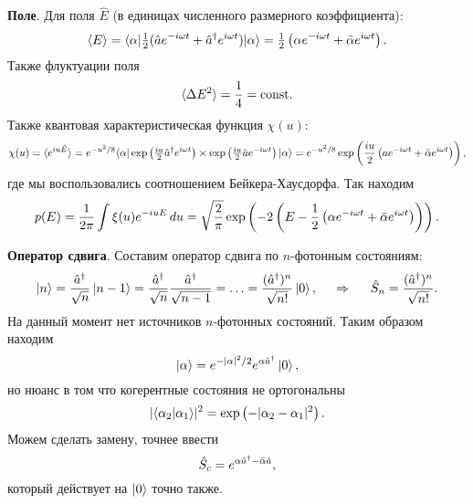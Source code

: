 \textbf{Поле}. Для поля $\hat{E}$ (в единицах численного размерного коэффициента):
\begin{equation*}
    \langle E\rangle  = \bk{\alpha}[ \tfrac{1}{2}(\hat{a} e^{- i \omega t} + \hat{a}\D e^{i \omega t})]{\alpha} = \tfrac{1}{2}\left(\alpha e^{- i \omega t} + \bar{\alpha} e^{i \omega t}\right).
\end{equation*}
Также флуктуации поля
\begin{equation*}
    \langle \Delta E^2\rangle = \frac{1}{4} = \textnormal{const}.
\end{equation*}
Также квантовая характеристическая функция $\chi(u)$:
\begin{equation*}
    \chi(u) = \langle e^{i u \hat{E}}\rangle = e^{- u^2/8} \bk{\alpha}[\exp\left( \tfrac{i u}{2} \hat{a}\D e^{i \omega t}\right) \times \exp\left(
        \tfrac{i u}{2} \hat{a} e^{- i \omega t}
    \right)]{\alpha} = 
    e^{-u^2/8} \exp\left(
        \frac{iu}{2} \left(a e^{- i \omega t} + \bar{\alpha} e^{i\omega t}\right)
    \right)
    ,
\end{equation*}
где мы воспользовались соотношением Бейкера-Хаусдорфа. Так находим
\begin{equation*}
    p(E) = \frac{1}{2\pi} \int \xi(u) e^{-i u E} \, d u = \sqrt{\frac{2}{\pi}} \exp\left(
        - 2 \left(E - \frac{1}{2}\left(\alpha e^{- i \omega t} + \bar{\alpha} e^{i \omega t}\right)\right)
    \right).
\end{equation*}




\textbf{Оператор сдвига}. Составим оператор сдвига по $n$-фотонным состояниям:
\begin{equation*}
    \left| n \right\rangle = \frac{\hat{a}^\dagger}{\sqrt{n}} \left| n-1 \right\rangle = \frac{\hat{a}^\dagger}{\sqrt{n}} \frac{\hat{a}^\dagger}{\sqrt{n-1}} = \ldots = \frac{(\hat{a}^\dagger)^n}{\sqrt{n!}} \left| 0 \right\rangle,
    \hspace{0.5cm} \Rightarrow \hspace{0.5cm}
    \hat{S}_n = \frac{(\hat{a}^\dagger)^n}{\sqrt{n!}}.
\end{equation*}
На данный момент нет источников $n$-фотонных состояний.
Таким образом находим
\begin{equation*}
    \left| \alpha \right\rangle = e^{-|\alpha|^2/2} e^{\alpha \hat{a}^\dagger} \left| 0 \right\rangle,
\end{equation*}
но нюанс в том что когерентные состояния не ортогональны
\begin{equation*}
    |\bk{\alpha_2}{\alpha_1}|^2 = \exp\left(-|\alpha_2-\alpha_1|^2\right).
\end{equation*}
Можем сделать замену, точнее ввести
\begin{equation*}
    \hat{S}_c = e^{\alpha \hat{a}^\dagger - \bar{\alpha} \hat{a}},
\end{equation*}
который действует на $\left| 0 \right\rangle$ точно также.



